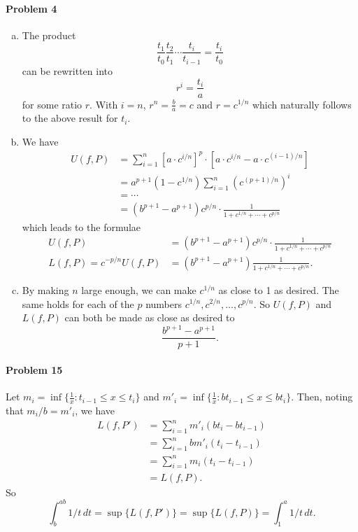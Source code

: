 \documentclass{article}
\begin{document}
\paragraph{Problem 4}
\begin{enumerate}[(a)]
  \item The product \[
      \frac{t_1}{t_0} \frac{t_2}{t_1} \cdots \frac{t_i}{t_{i - 1}}
      = \frac{t_i}{t_0}
    \] can be rewritten into \[
      r^i = \frac{t_i}{a}
    \] for some ratio $r$. With $i = n$, $r^n = \frac{b}{a} = c$ and $r =
    c^{1/n}$ which naturally follows to the above result for $t_i$.
  \item We have
    \begin{align*}
      U(f, P)
      &= \sum_{i=1}^n [a \cdot c^{i/n}]^p \cdot
      [a \cdot c^{i/n} - a \cdot c^{(i-1)/n}] \\
      &= a^{p+1}(1 - c^{1/n}) \sum_{i=1}^n (c^{(p+1)/n})^i \\
      &= \cdots \\
      &= (b^{p+1} - a^{p+1})c^{p/n} \cdot \frac{1}{1 + c^{1/n} + \cdots +
        c^{p/n}}
    \end{align*}
    which leads to the formulae
    \begin{align*}
      U(f, P)
      &= (b^{p + 1} - a^{p + 1})c^{p/n} \cdot \frac{1}{1 + c^{1/n} + \cdots +
      c^{p/n}} \\
      L(f, P) = c^{-p/n}U(f, P)
      &= (b^{p + 1} - a^{p + 1})\frac{1}{1 + c^{1/n} + \cdots + c^{p/n}}.
    \end{align*}
  \item By making $n$ large enough, we can make $c^{1/n}$ as close to 1 as
    desired. The same holds for each of the $p$ numbers $c^{1/n}, c^{2/n},
    \ldots, c^{p/n}$. So $U(f, P)$ and $L(f, P)$ can both be made as close as
    desired to \[
      \frac{b^{p + 1} - a^{p + 1}}{p + 1}.
    \]
\end{enumerate}

\paragraph{Problem 15} Let $m_i = \inf\{\frac{1}{x}: t_{i - 1} \leq x \leq
t_i\}$ and $m'_i = \inf\{\frac{1}{x}: bt_{i - 1} \leq x \leq bt_i\}$. Then,
noting that $m_i/b = m'_i$, we have
\begin{align*}
  L(f, P')
  &= \sum_{i = 1}^n m'_i(bt_i - bt_{i - 1}) \\
  &= \sum_{i = 1}^n bm'_i(t_i - t_{i - 1}) \\
  &= \sum_{i = 1}^n m_i(t_i - t_{i - 1}) \\
  &= L(f, P).
\end{align*}
So \[
  \int_b^{ab} 1/t \,dt
  = \sup\{L(f, P')\}
  = \sup\{L(f, P)\}
  = \int_1^a 1/t \,dt.
\]
\end{document}
